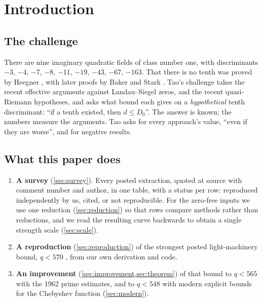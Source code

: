 \documentclass[11pt]{article}
\theoremstyle{definition}
\begin{document}
\section{Introduction}

\subsection{The challenge}
There are nine imaginary quadratic fields of class number one, with discriminants $-3$, $-4$, $-7$, $-8$, $-11$, $-19$, $-43$, $-67$, $-163$. That there is no tenth was proved by Heegner \cite{Heegner1952}, with later proofs by Baker \cite{Baker1966} and Stark \cite{Stark1967}. Tao's challenge \cite{Tao2026} takes the recent effective arguments against Landau--Siegel zeros, and the recent quasi-Riemann hypotheses, and asks what bound each gives on a \emph{hypothetical} tenth discriminant: ``if a tenth existed, then $d \le D_0$''. The answer is known; the numbers measure the arguments. Tao asks for every approach's value, ``even if they are worse'', and for negative results.

\subsection{What this paper does}
\begin{enumerate}[leftmargin=*]
\item \textbf{A survey} (\cref{sec:survey}). Every posted extraction, quoted at source with comment number and author, in one table, with a status per row: reproduced independently by us, cited, or not reproducible. For the zero-free inputs we use one reduction (\cref{sec:reduction}) so that rows compare methods rather than reductions, and we read the resulting curve backwards to obtain a single strength scale (\cref{sec:scale}).
\item \textbf{A reproduction} (\cref{sec:reproduction}) of the strongest posted light-machinery bound, $q < 570$ \cite{twinheterodox}, from our own derivation and code.
\item \textbf{An improvement} (\cref{sec:improvement,sec:theorem}) of that bound to $q < 565$ with the 1962 prime estimates, and to $q < 548$ with modern explicit bounds for the Chebyshev function (\cref{sec:modern}).
\end{enumerate}
\end{document}
